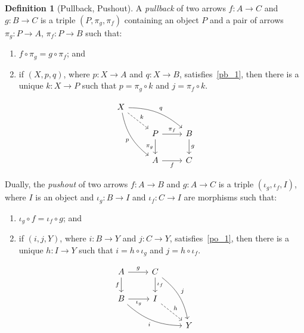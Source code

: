 \documentclass[a4paper, twoside,openright]{report}
\theoremstyle{plain}
\theoremstyle{definition}
\newtheorem{definition}[theorem]{Definition}
\begin{document}
\begin{definition}[Pullback, Pushout]
        A \emph{pullback} of two arrows $f: A \rightarrow C$ and $g: B \rightarrow C$ is a triple $(P, \pi_g, \pi_f)$ containing an object $P$ and a pair of arrows $\pi_g: P \rightarrow A$, $\pi_f: P \rightarrow B$ such that:
        \begin{enumerate}
            \item\label{pb_1} $f \circ \pi_g = g \circ \pi_f$; and
            \item if $(X, p, q)$, where $p: X \rightarrow A$ and $q: X \rightarrow B$, satisfies~\ref{pb_1}, then there is a unique $k:X \rightarrow P$ such that $p = \pi_g \circ k$ and $j = \pi_f \circ k$.
        \end{enumerate}
        \[
        \begin{tikzcd}
        X \arrow[drr, bend left=20, "q"] \arrow[ddr, bend right=20,"p" swap] \arrow[dr, dashed, "k"] & & \\
        & P  \arrow[d, "{\pi_g}" swap] \arrow[r, "{\pi_f}"] & B \arrow[d, "g"] \\
        & A  \arrow[r, "f" swap] & C
        \end{tikzcd}
    \]

    Dually, the \emph{pushout} of two arrows $f: A \rightarrow B$ and $g: A\rightarrow C$ is a triple $(\iota_g, \iota_f, I)$, where $I$ is an object and $\iota_g:B \rightarrow I$ and $\iota_f: C \rightarrow I$ are morphisms such that:
    \begin{enumerate}
        \item\label{po_1} $\iota_g \circ f = \iota_f \circ g$; and 
        \item if $(i, j, Y)$, where $i: B \rightarrow Y$ and $j: C \rightarrow Y$, satisfies~\ref{po_1}, then there is a unique $h: I \rightarrow Y$ such that $i = h \circ \iota_g$ and $j = h \circ \iota_f$.  
    \end{enumerate}
    \[\begin{tikzcd}
        A & C \\
        B & I \\
        && Y
        \arrow["g", from=1-1, to=1-2]
        \arrow["f" swap, from=1-1, to=2-1]
        \arrow["{{\iota_f}}", from=1-2, to=2-2]
        \arrow["j", bend left=20, from=1-2, to=3-3]
        \arrow["{{\iota_g}}" swap, from=2-1, to=2-2]
        \arrow["i" swap, bend right=20, from=2-1, to=3-3]
        \arrow["h", dashed, from=2-2, to=3-3]
    \end{tikzcd}\]
    {%
    }
\end{definition}
\end{document}
